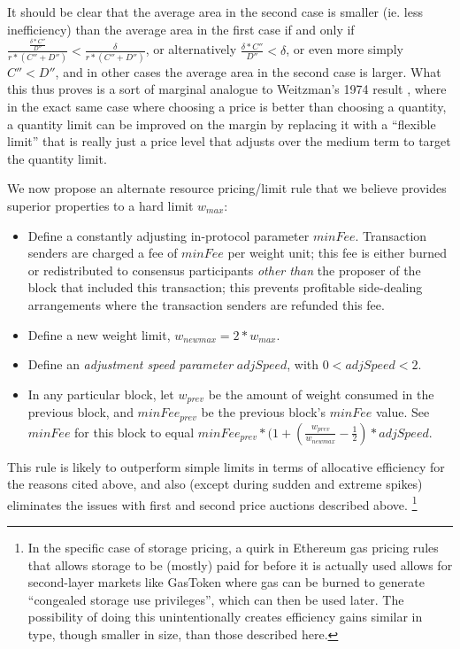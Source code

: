 \documentclass[12pt, final]{article}
\begin{document}
It should be clear that the average area in the second case is smaller (ie. less inefficiency) than the average area in the first case if and only if $\frac{\frac{\delta * C''}{D''}}{r * (C'' + D'')} < \frac{\delta}{r * (C'' + D'')}$, or alternatively $\frac{\delta * C''}{D''} < \delta$, or even more simply $C'' < D''$, and in other cases the average area in the second case is larger. What this thus proves is a sort of marginal analogue to Weitzman's 1974 result \cite{weitzman1974prices}, where in the exact same case where choosing a price is better than choosing a quantity, a quantity limit can be improved on the margin by replacing it with a ``flexible limit'' that is really just a price level that adjusts over the medium term to target the quantity limit.

We now propose an alternate resource pricing/limit rule that we believe provides superior properties to a hard limit $w_{max}$:

\begin{itemize}
\item Define a constantly adjusting in-protocol parameter $minFee$. Transaction senders are charged a fee of $minFee$ per weight unit; this fee is either burned or redistributed to consensus participants \emph{other than} the proposer of the block that included this transaction; this prevents profitable side-dealing arrangements where the transaction senders are refunded this fee.
\item Define a new weight limit, $w_{newmax} = 2 * w_{max}$.
\item Define an \emph{adjustment speed parameter} $adjSpeed$, with $0 < adjSpeed < 2$.
\item In any particular block, let $w_{prev}$ be the amount of weight consumed in the previous block, and $minFee_{prev}$ be the previous block's $minFee$ value. See $minFee$ for this block to equal $minFee_{prev} * (1 + (\frac{w_{prev}}{w_{newmax}} - \frac{1}{2}) * adjSpeed$.
\end{itemize}

This rule is likely to outperform simple limits in terms of allocative efficiency for the reasons cited above, and also (except during sudden and extreme spikes) eliminates the issues with first and second price auctions described above. \footnote{In the specific case of storage pricing, a quirk in Ethereum gas pricing rules that allows storage to be (mostly) paid for before it is actually used allows for second-layer markets like GasToken\cite{gastoken} where gas can be burned to generate ``congealed storage use privileges'', which can then be used later. The possibility of doing this unintentionally creates efficiency gains similar in type, though smaller in size, than those described here.}
\end{document}
